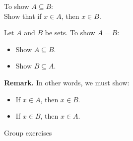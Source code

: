 \documentclass[10pt]{beamer}
\begin{document}
\begin{frame}

\begin{mybluebox}[title=Proof Template: Proving one set is a subset of another]
To show $A \subseteq B$: \\
\hspace*{1.5em} Show that if $x \in A$, then $x \in B$.
\end{mybluebox}

\end{frame}


\begin{frame}

\begin{mybluebox}[title=Proof Template: Proving two sets are equal]
Let $A$ and $B$ be sets.  To show $A = B$: 
\begin{itemize}
	\item Show $A \subseteq B$.
	\item Show $B \subseteq A$.
\end{itemize}
\end{mybluebox}
\vfill
\pause
\colorbox{blue!30}{\textbf{Remark.}} In other words, we must show:
\begin{itemize}
	\item If $x \in A$, then $x \in B$.
	\item If $x \in B$, then $x \in A$.
\end{itemize}

\end{frame}

\begin{frame}[standout]
Group exercises
\end{frame}
\end{document}
